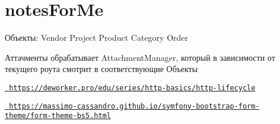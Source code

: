 \chapter{notes\+For\+Me}
\hypertarget{md_notes_for_me}{}\label{md_notes_for_me}
Объекты\+: Vendor Project Product Category Order

Аттачменты обрабатывает Attachment\+Manager, который в зависимости от текущего роута смотрит в соответствующие Объекты

\href{https://deworker.pro/edu/series/http-basics/http-lifecycle}{\texttt{ https\+://deworker.\+pro/edu/series/http-\/basics/http-\/lifecycle}}

\href{https://massimo-cassandro.github.io/symfony-bootstrap-form-theme/form-theme-bs5.html}{\texttt{ https\+://massimo-\/cassandro.\+github.\+io/symfony-\/bootstrap-\/form-\/theme/form-\/theme-\/bs5.\+html}} 